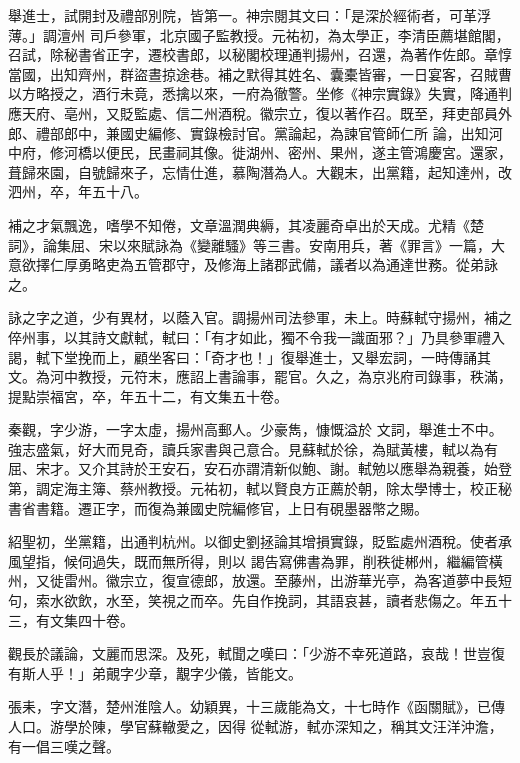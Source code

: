 \begin{pinyinscope}
 舉進士，試開封及禮部別院，皆第一。神宗閱其文曰：「是深於經術者，可革浮薄。」調澶州
 司戶參軍，北京國子監教授。元祐初，為太學正，李清臣薦堪館閣，召試，除秘書省正字，遷校書郎，以秘閣校理通判揚州，召還，為著作佐郎。章惇當國，出知齊州，群盜晝掠途巷。補之默得其姓名、囊橐皆審，一日宴客，召賊曹以方略授之，酒行未竟，悉擒以來，一府為徹警。坐修《神宗實錄》失實，降通判應天府、亳州，又貶監處、信二州酒稅。徽宗立，復以著作召。既至，拜吏部員外郎、禮部郎中，兼國史編修、實錄檢討官。黨論起，為諫官管師仁所
 論，出知河中府，修河橋以便民，民畫祠其像。徙湖州、密州、果州，遂主管鴻慶宮。還家，葺歸來園，自號歸來子，忘情仕進，慕陶潛為人。大觀末，出黨籍，起知達州，改泗州，卒，年五十八。



 補之才氣飄逸，嗜學不知倦，文章溫潤典縟，其凌麗奇卓出於天成。尤精《楚詞》，論集屈、宋以來賦詠為《變離騷》等三書。安南用兵，著《罪言》一篇，大意欲擇仁厚勇略吏為五管郡守，及修海上諸郡武備，議者以為通達世務。從弟詠之。



 詠之字之道，少有異材，以蔭入官。調揚州司法參軍，未上。時蘇軾守揚州，補之倅州事，以其詩文獻軾，軾曰：「有才如此，獨不令我一識面邪？」乃具參軍禮入謁，軾下堂挽而上，顧坐客曰：「奇才也！」復舉進士，又舉宏詞，一時傳誦其文。為河中教授，元符末，應詔上書論事，罷官。久之，為京兆府司錄事，秩滿，提點崇福宮，卒，年五十二，有文集五十卷。



 秦觀，字少游，一字太虛，揚州高郵人。少豪雋，慷慨溢於
 文詞，舉進士不中。強志盛氣，好大而見奇，讀兵家書與己意合。見蘇軾於徐，為賦黃樓，軾以為有屈、宋才。又介其詩於王安石，安石亦謂清新似鮑、謝。軾勉以應舉為親養，始登第，調定海主簿、蔡州教授。元祐初，軾以賢良方正薦於朝，除太學博士，校正秘書省書籍。遷正字，而復為兼國史院編修官，上日有硯墨器幣之賜。



 紹聖初，坐黨籍，出通判杭州。以御史劉拯論其增損實錄，貶監處州酒稅。使者承風望指，候伺過失，既而無所得，則以
 謁告寫佛書為罪，削秩徙郴州，繼編管橫州，又徙雷州。徽宗立，復宣德郎，放還。至藤州，出游華光亭，為客道夢中長短句，索水欲飲，水至，笑視之而卒。先自作挽詞，其語哀甚，讀者悲傷之。年五十三，有文集四十卷。



 觀長於議論，文麗而思深。及死，軾聞之嘆曰：「少游不幸死道路，哀哉！世豈復有斯人乎！」弟覿字少章，覯字少儀，皆能文。



 張耒，字文潛，楚州淮陰人。幼穎異，十三歲能為文，十七時作《函關賦》，已傳人口。游學於陳，學官蘇轍愛之，因得
 從軾游，軾亦深知之，稱其文汪洋沖澹，有一倡三嘆之聲。




\end{pinyinscope}
